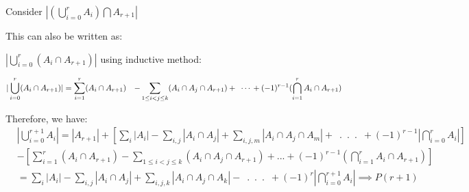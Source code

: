 \documentclass{article}
\begin{document}
\begin{flushleft}
	Consider $|(\bigcup_{i=0}^{r}A_i)\bigcap A_{r+1}|$
	\newline
	\newline
		
	This can also be written as:
		
	$\left|\bigcup_{i=0}^{r}\left(A_i\cap A_{r+1}\right)\right|$
	\newline
	\newline
	using inductive method:
		
		
	\begin{align*}
		|\bigcup_{i=0}^{r}(A_i\cap A_{r+1})|
		  & =\sum_{i=1}^r(A_i \cap A_{r+1} )                                      
		\newline
		  & -\sum_{1\leq i < j \leq k}(A_i \cap A_j \cap A_{r+1})+\enspace \cdots 
		\newline
		\newline
		  & +(-1)^{r-1}(\bigcap_{i=1}^r A_i \cap A_{r+1})                         
	\end{align*}
		
	Therefore, we have:
	\begin{align*}
		  & \left|\bigcup_{i=0}^{r+1}A_i\right|=|A_{r+1}|+\left[ \sum_{i} |A_i|-\sum_{i,j} |A_i \cap A_j| + \sum_{i,j,m}|A_i \cap A_j \cap A_m| + \enspace . \enspace . \enspace . \enspace +(-1)^{r-1}\left|\bigcap_{i=0}^{r}A_i\right|\right] \\
		  & - \left[\sum_{i=1}^r(A_i \cap A_{r+1} )                                                                                                                                                                                             
		-\sum_{1\leq i < j \leq k}(A_i \cap A_j \cap A_{r+1})+...
		+(-1)^{r-1}(\bigcap_{i=1}^r A_i \cap A_{r+1})\right]\\
		  & =\sum_{i} |A_i|-\sum_{i,j} |A_i \cap A_j| + \sum_{i,j,k}|A_i \cap A_j \cap A_k| - \enspace . \enspace . \enspace . \enspace +(-1)^{r}|\bigcap_{i=0}^{r+1}A_i|                                                                       
		\implies P(r+1)
	\end{align*}
	\newline
	\newline
		
		
\end{flushleft}
\end{document}
